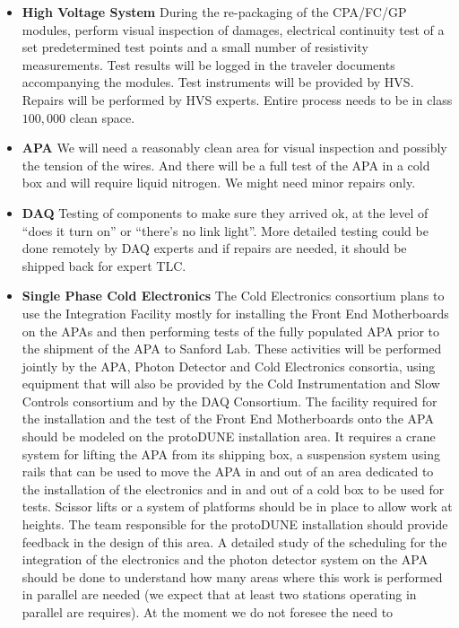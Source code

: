 \begin{itemize}
  \item {\bf High Voltage System} During the re-packaging of the CPA/FC/GP modules, perform 
visual inspection of damages, electrical continuity test of a set predetermined test points and a 
small number of resistivity measurements.  Test results will be logged in the traveler documents 
accompanying the modules.  Test instruments will be provided by HVS.  Repairs will be performed 
by HVS experts. Entire process needs to be in class $100,000$ clean space. 
  \item {\bf APA} We will need a reasonably clean area for visual inspection and possibly the tension 
of the wires.  And there will be a full test of the APA in a cold box and will require liquid nitrogen.
We might need minor repairs only.
  \item {\bf DAQ} Testing of components to make sure they arrived ok, at the level of ``does it turn on'' or ``there's no link light''.  More detailed testing could be done remotely by DAQ experts and if repairs are needed, it should be shipped back for expert TLC.
  \item {\bf Single Phase Cold Electronics} The Cold Electronics consortium plans to use 
the Integration Facility mostly for installing the Front End Motherboards on the APAs and then 
performing tests of the fully populated APA prior to the shipment of the APA to Sanford Lab. These 
activities will be performed jointly by the APA, Photon Detector and Cold Electronics consortia, 
using equipment that will also be provided by the Cold Instrumentation and Slow Controls 
consortium and by the DAQ Consortium. The facility required for the installation and the test of the 
Front End Motherboards onto the APA should be modeled on the protoDUNE installation area. It 
requires a crane system for lifting the APA from its shipping box, a suspension system using rails 
that can be used to move the APA in and out of an area dedicated to the installation of the 
electronics and in and out of a cold box to be used for tests. Scissor lifts or a system of platforms 
should be in place to allow work at heights. The team responsible for the protoDUNE installation 
should provide feedback in the design of this area. A detailed study of the scheduling for the 
integration of the electronics and the photon detector system on the APA should be done to 
understand how many areas where this work is performed in parallel are needed (we expect that at 
least two stations operating in parallel are requires). At the moment we do not foresee the need to 

\end{itemize}
